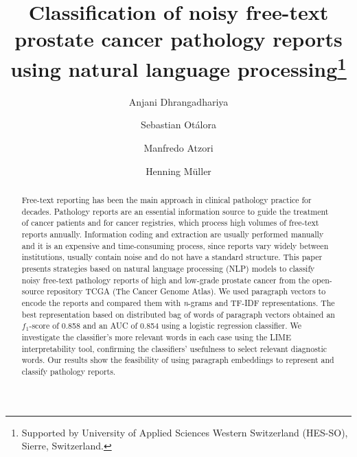 \documentclass[runningheads]{llncs}
\begin{document}
%
\title{Classification of noisy free-text prostate cancer pathology reports using natural language processing\thanks{Supported by University of Applied Sciences Western Switzerland (HES-SO), Sierre, Switzerland.}}
\author{Anjani Dhrangadhariya \and
Sebastian Otálora \and
Manfredo Atzori \and Henning M\"uller}
%
%
%
\maketitle              %
%
\begin{abstract}
Free-text reporting has been the main approach in clinical pathology practice for decades. 
Pathology reports are an essential information source to guide the treatment of cancer patients and for cancer registries, which process high volumes of free-text reports annually. Information coding and extraction are usually performed manually and it is an expensive and time-consuming process, since reports vary widely between institutions, usually contain noise and do not have a standard structure.
This paper presents strategies based on natural language processing (NLP) models to classify noisy free-text pathology reports of high and low-grade prostate cancer from the open-source repository TCGA (The Cancer Genome Atlas). 
We used paragraph vectors to encode the reports and compared them with \textit{n}-grams and TF-IDF representations. The best representation based on distributed bag of words of paragraph vectors obtained an $f_{1}$-score of 0.858 and an AUC of 0.854 using a logistic regression classifier. We investigate the classifier's more relevant words in each case using the LIME interpretability tool, confirming the classifiers' usefulness to select relevant diagnostic words. Our results show the feasibility of using paragraph embeddings to represent and classify pathology reports. 
\end{abstract}
%
\end{document}
